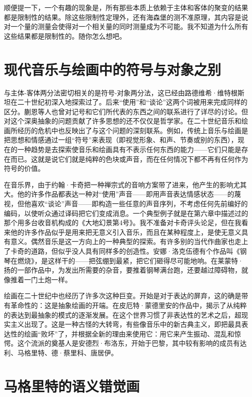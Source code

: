 顺便提一下，一个有趣的现象是，所有那些本质上依赖于主体和客体的聚变的结果都是限制性的结果。除这些限制性定理外，还有海森堡的测不准原理，其内容是说对一个量的测量会使得对一个相关量的同时测量成为不可能。我不知道为什么所有这些结果都是限制性的。随你怎么想吧。

\section{现代音乐与绘画中的符号与对象之别}

与主体-客体两分法密切相关的是符号-对象两分法，这已经由路德维希·维特根斯坦在二十世纪初深入地探索过了。后来“使用”和“谈论”这两个词被用来完成同样的区分。蒯恩等人也曾对记号和它们所代表的东西之间的联系进行了详尽的讨论。但对这个深奥抽象的问题贡献了许多思想的还不仅仅是哲学家。在二十世纪音乐和绘画所经历的危机中也反映出了与这个问题的深刻联系。例如，传统上音乐与绘画是把思想和情感通过一组“符号”来表现（即视觉形象、和声、节奏或别的东西），现在的一种趋势是去探索使音乐和绘画具有不表示任何东西的能力——它们只能是存在而已。这就是说它们就是纯粹的色块或声音，而在任何情况下都不再有任何作为符号的价值。

在音乐界，由于约翰·卡奇把一种禅宗式的音响方案带了进来，他产生的影响尤其大。他的许多作品都表达一种对“使用”声音——即用声音表达情感状态——的蔑视，但他喜欢“谈论”声音——即构造一些任意的声音序列，不考虑任何先前编好的编码，以使听众通过译码把它们变成消息。一个典型例子就是在第六章中描述过的那个用多台收音机构成的《大地幻景第4号》。我不准备对卡奇评头论足，但在我看来他的许多作品似乎是用来把无意义引入音乐，而且在某种程度上，是使无意义具有意义。偶然音乐是这一方向上的一种典型的探索。有许多别的当代作曲家也走上了卡奇的道路，但似乎没人具有同样多的创造性。安娜·洛克伍德有个作品叫《钢琴在燃烧》，是这样干的——把弦绷到最紧，把它们砸得尽可能地响。在莱蒙特·扬的一部作品中，为发出所需要的杂音，要推着钢琴满台跑，还要越过障碍物，就像推着一门土炮一样。

绘画在二十世纪中也经历了许多次这种巨变。开始是对于表达的屏弃，这的确是带有革命性的：这是抽象绘画的开端。在皮厄特·蒙德里安的作品中，揭示了从纯粹的表达到最抽象的模式的逐渐发展。在这个世界习惯了非表达性的艺术之后，超现实主义出现了。这是一种古怪的大转弯，有些像音乐中的新古典主义，即把最具表达性的绘画“败坏”了，并根据全新的理由来使用它：用它来产生振动、混乱和惊愕。这个流派的奠基人是安德烈·布洛东，开始于巴黎，其中较有影响的成员有达利、马格里特、德·蔡里科、唐居伊。

\section{马格里特的语义错觉画}

